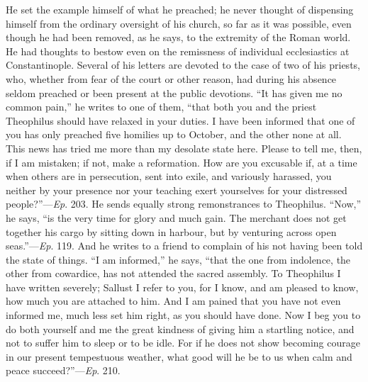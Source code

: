 He set the example himself of what he preached; he never thought of
dispensing himself from the ordinary oversight of his church, so far
as it was possible, even though he had been removed, as he says, to
the extremity of the Roman world. He had thoughts to bestow even on
the remissness of individual ecclesiastics at Constantinople. Several
of his letters are devoted to the case of two of his priests, who,
whether from fear of the court or other reason, had during his absence
seldom preached or been present at the public devotions. ``It has
given me no common pain,'' he writes to one of them, ``that
both you and the priest Theophilus should have relaxed in your duties.
I have been informed that one of you has only preached five
homilies up to October, and the other none at all. This news has tried
me more than my desolate state here. Please to tell me, then, if I am
mistaken; if not, make a reformation. How are you excusable if, at a
time when others are in persecution, sent into exile, and variously
harassed, you neither by your presence nor your teaching exert
yourselves for your distressed people?''—\emph{Ep}. 203. He
sends equally strong remonstrances to Theophilus. ``Now,'' he
says, ``is the very time for glory and much gain. The merchant
does not get together his cargo by sitting down in harbour, but by
venturing across open seas.''—\emph{Ep}. 119. And he writes to a
friend to complain of his not having been told the state of things.
``I am informed,'' he says, ``that the one from indolence,
the other from cowardice, has not attended the sacred assembly. To
Theophilus I have written severely; Sallust I refer to you, for I
know, and am pleased to know, how much you are attached to him. And I
am pained that you have not even informed me, much less set him right,
as you should have done. Now I beg you to do both yourself and me the
great kindness of giving him a startling notice, and not to suffer him
to sleep or to be idle. For if he does not show becoming courage in
our present tempestuous weather, what good will he be to us when calm
and peace succeed?''—\emph{Ep}. 210.

